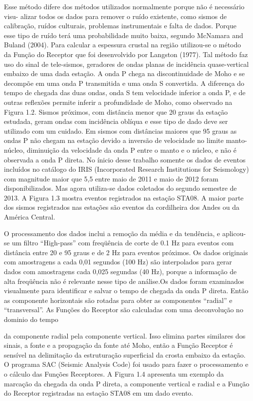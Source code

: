 Esse método difere dos métodos utilizados normalmente porque não é necessário visu-
alizar todos os dados para remover o ruído existente, como sismos de calibração, ruídos
culturais, problemas instrumentais e falta de dados. Porque esse tipo de ruído terá uma
probabilidade muito baixa, segundo McNamara and Buland (2004).
Para calcular a espessura crustal na região utilizou-se o método da Função do Receptor
que foi desenvolvido por Langston (1977). Tal método faz uso do sinal de tele-sismos,
geradores de ondas planas de incidência quase-vertical embaixo de uma dada estação. A
onda P chega na discontinuidade de Moho e se decompõe em uma onda P transmitida e
uma onda S convertida. A diferença do tempo de chegada das duas ondas, onda S tem
velocidade inferior a onda P, e de outras reflexões permite inferir a profundidade de Moho,
como observado na Figura 1.2.
Sismos próximos, com distância menor que 20 graus da estação estudada, geram ondas
com incidência oblíqua e esse tipo de dado deve ser utilizado com um cuidado. Em sismos
com distâncias maiores que 95 graus as ondas P não chegam na estação devido a inversão
de velocidade no limite manto-núcleo, diminuição da velocidade da onda P entre o manto
e o núcleo, e não é observada a onda P direta.
No ínicio desse trabalho somente os dados de eventos incluídos no catálogo do IRIS
(Incorporated Research Institutions for Seismology) com magnitude maior que 5,5 entre
maio de 2011 e maio de 2012 foram disponibilizados. Mas agora utiliza-se dados coletados
do segundo semestre de 2013. A Figura 1.3 mostra eventos registrados na estação STA08.
A maior parte dos sismos registrados nas estações são eventos da cordilheira dos Andes
ou da América Central.

O processamento dos dados inclui a remoção da média e da tendência, e aplicou-se um filtro “High-pass” com freqüência de corte de 0.1 Hz para eventos com distância entre
20 e 95 graus e de 2 Hz para eventos próximos. Os dados originais com amostragens a
cada 0,01 segundos (100 Hz) são interpolados para gerar dados com amostragens cada
0,025 segundas (40 Hz), porque a informação de alta freqüência não é relevante nesse tipo
de análise.Os dados foram examinados visualmente para identificar e salvar o tempo de
chegada da onda P direta. Então as componente horizontais são rotadas para obter as
componentes “radial” e “transversal”.
As Funções do Receptor são calculadas com uma deconvolução no dominio do tempo

da componente radial pela componente vertical. Isso elimina partes similares dos sinais, a
fonte e a propagação da fonte até Moho, então a Função Receptor é sensível na delimitação
da estruturação superficial da crosta embaixo da estação. O programa SAC (Seismic
Analysis Code) foi usado para fazer o processamento e o cálculo das Funções Receptores. A
Figura 1.4 apresenta um exemplo da marcação da chegada da onda P direta, a componente
vertical e radial e a Função do Receptor registradas na estação STA08 em um dado evento.

